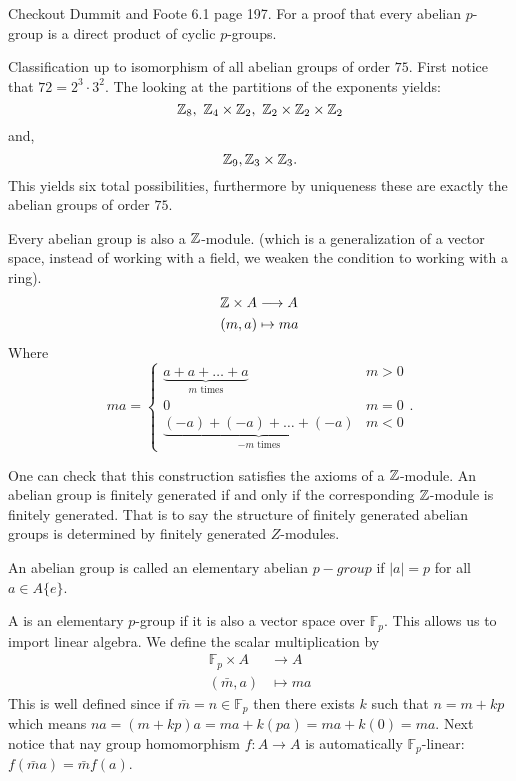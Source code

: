 \documentclass[11pt,leqno,oneside]{amsart}
\newcommand{\Fp}{{\mathbb{F}_p}} %
\begin{document}
\begin{rmk*}
  Checkout Dummit and Foote 6.1 page
  197. For a proof that every abelian
  \(p\)-group is a direct product of
  cyclic \(p\)-groups.
\end{rmk*}

\begin{example*}
  Classification up to isomorphism of
  all abelian groups of order
  \(75\). First notice that
  \(72=2^3 \cdot 3^2\). The looking at
  the partitions of the exponents
  yields:
  \[{\mathbb Z}_8,\ {\mathbb Z}_4 \times {\mathbb Z}_2,\ {\mathbb Z}_2
    \times {\mathbb Z}_2 \times {\mathbb Z}_2\] and,
  \[{\mathbb Z}_9, {\mathbb Z}_3 \times {\mathbb Z}_3.\]
  This yields six total possibilities,
  furthermore by uniqueness these are
  exactly the abelian groups of order
  \(75\).
\end{example*}

\begin{rmk*}[1.2.11]
  Every abelian group is also a
  \({\mathbb Z}\)-module. (which is a
  generalization of a vector space,
  instead of working with a field, we
  weaken the condition to working with a
  ring).
  \begin{align*}
    {\mathbb Z} \times A &\longrightarrow A\\
    (m,a)& \mapsto ma
  \end{align*}
  Where
  \[ma =
    \begin{cases}
      \underbrace{a+a+\ldots+a}_{m \text{ times}} & m > 0\\
      0 & m=0\\
      \underbrace{(-a)+(-a)+\ldots+(-a)}_{-m
        \text{ times}} & m < 0
    \end{cases}.
  \]
\end{rmk*}
One can check that this construction
satisfies the axioms of a
\({\mathbb Z}\)-module. An abelian group is
finitely generated if and only if the
corresponding \({\mathbb Z}\)-module is finitely
generated. That is to say the structure
of finitely generated abelian groups is
determined by finitely generated
\(Z\)-modules.

\begin{defn*}[1.2.12]
  An abelian group is called an
  elementary abelian \(p-group\) if
  \(|a|=p\) for all \(a \in A\{e\}\).
\end{defn*}

\begin{rmk*}[1.2.13]
  A is an elementary \(p\)-group if it
  is also a vector space over
  \(\Fp\). This allows us to import
  linear algebra. We define the scalar
  multiplication by
  \begin{align*}
    \Fp \times A &\longrightarrow A\\
    (\bar{m},a) &\longmapsto ma
  \end{align*}
  This is well defined since if
  \(\bar{m} = n \in \Fp\) then there
  exists \(k\) such that \(n=m+kp\)
  which means
  \(na=(m+kp)a=ma+k(pa)=ma+k(0)=ma\). Next
  notice that nay group homomorphism
  \(f \colon A \to A\) is automatically
  \(\Fp\)-linear:
  \(f(\bar{m}a)=\bar{m}f(a)\).
\end{rmk*}
\end{document}
